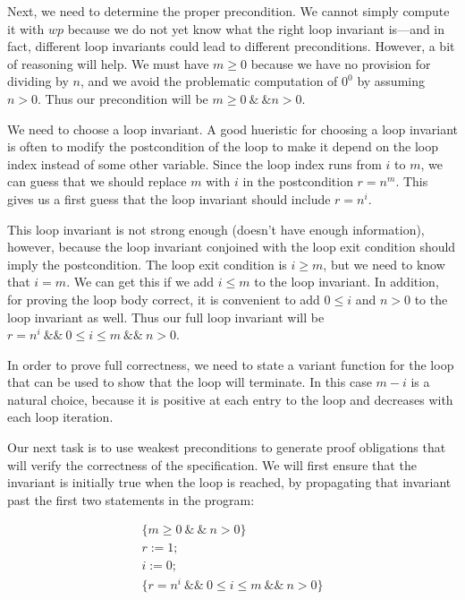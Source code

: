 \documentclass[11pt]{article}
\begin{document}
    Next, we need to determine the proper precondition. We cannot simply
    compute it with $wp$ because we do not yet know what the right loop
    invariant is---and in fact, different loop invariants could lead to
    different preconditions. However, a bit of reasoning will help. We
    must have $m \ge 0$ because we have no provision for dividing by $n$,
    and we avoid the problematic computation of $0^0$ by assuming $n>0$.
    Thus our precondition will be $m \ge 0 ~\&~\& n > 0$.

    We need to choose a loop invariant. A good hueristic for choosing a
    loop invariant is often to modify the postcondition of the loop to
    make it depend on the loop index instead of some other variable.
    Since the loop index runs from $i$ to $m$, we can guess that we should
    replace $m$ with $i$ in the postcondition $r=n^m$. This gives us a
    first guess that the loop invariant should include $r=n^i$.

    This loop invariant is not strong enough (doesn't have enough
    information), however, because the loop invariant conjoined with the
    loop exit condition should imply the postcondition. The loop exit
    condition is $i \ge m$, but we need to know that $i = m$. We can get
    this if we add $i \le m$ to the loop invariant. In addition, for
    proving the loop body correct, it is convenient to add $0 \le i$ and
    $n > 0$ to the loop invariant as well. Thus our full loop invariant
    will be $r=n^i ~\&\&~ 0 \le i \le m ~\&\&~ n > 0$.

    In order to prove full correctness, we need to state a variant function
    for the loop that can be used to show that the loop will terminate.
    In this case $m-i$ is a natural choice, because it is positive at
    each entry to the loop and decreases with each loop iteration.

    Our next task is to use weakest preconditions to generate proof
    obligations that will verify the correctness of the specification.
    We will first ensure that the invariant is initially true when
    the loop is reached, by propagating that invariant past the first
    two statements in the program:

    \[
        \begin{array}{l}
            \{m \ge 0 ~\&~\&~ n > 0\}\\
            r := 1;\\
            i := 0;\\
            \{ r=n^i ~\&\&~ 0 \le i \le m ~\&\&~ n > 0 \}
        \end{array}
    \]
\end{document}
